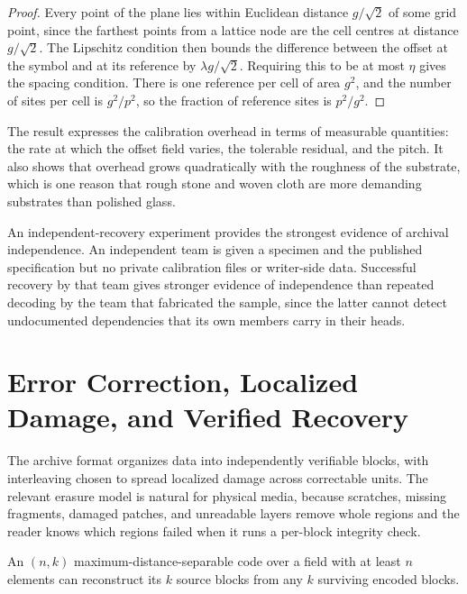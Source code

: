 \begin{proof}
Every point of the plane lies within Euclidean distance $g/\sqrt2$ of some grid point, since the farthest points from a lattice node are the cell centres at distance $g/\sqrt2$. The Lipschitz condition then bounds the difference between the offset at the symbol and at its reference by $\lambda g/\sqrt2$. Requiring this to be at most $\eta$ gives the spacing condition. There is one reference per cell of area $g^2$, and the number of sites per cell is $g^2/p^2$, so the fraction of reference sites is $p^2/g^2$.
\end{proof}

The result expresses the calibration overhead in terms of measurable quantities: the rate at which the offset field varies, the tolerable residual, and the pitch. It also shows that overhead grows quadratically with the roughness of the substrate, which is one reason that rough stone and woven cloth are more demanding substrates than polished glass.

An independent-recovery experiment provides the strongest evidence of archival independence. An independent team is given a specimen and the published specification but no private calibration files or writer-side data. Successful recovery by that team gives stronger evidence of independence than repeated decoding by the team that fabricated the sample, since the latter cannot detect undocumented dependencies that its own members carry in their heads.

\section{Error Correction, Localized Damage, and Verified Recovery}\label{sec:ecc}

The archive format organizes data into independently verifiable blocks, with interleaving chosen to spread localized damage across correctable units. The relevant erasure model is natural for physical media, because scratches, missing fragments, damaged patches, and unreadable layers remove whole regions and the reader knows which regions failed when it runs a per-block integrity check.

\begin{proposition}\label{prop:mds}
An $(n,k)$ maximum-distance-separable code over a field with at least $n$ elements can reconstruct its $k$ source blocks from any $k$ surviving encoded blocks.
\end{proposition}

